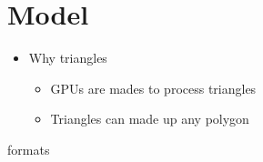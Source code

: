 \chapter{Model}

\begin{itemize}
  \item Why triangles
  \begin{itemize}
    \item GPUs are mades to process triangles
    \item Triangles can made up any polygon
  \end{itemize}
\end{itemize}

{formats}
